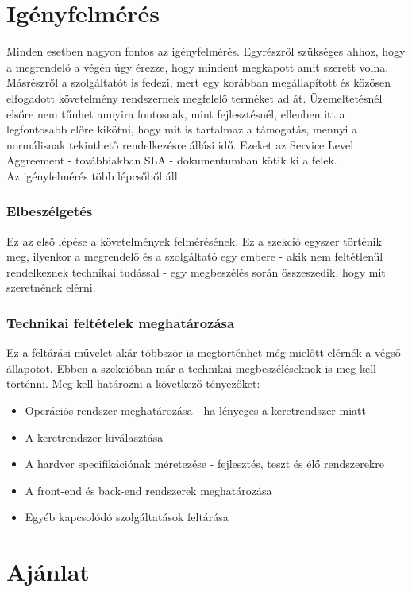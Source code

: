 \documentclass[12pt,oneside,justify,table]{book}
\begin{document}
\section{Igényfelmérés}
Minden esetben nagyon fontos az igényfelmérés. Egyrészről szükséges ahhoz, hogy a megrendelő a végén úgy érezze, hogy mindent megkapott amit szerett volna. Másrészről a szolgáltatót is fedezi, mert egy korábban megállapított és közösen elfogadott követelmény rendszernek megfelelő terméket ad át. Üzemeltetésnél elsőre nem tűnhet annyira fontosnak, mint fejlesztésnél, ellenben itt a legfontosabb előre kikötni, hogy mit is tartalmaz a támogatás, mennyi a normálisnak tekinthető rendelkezésre állási idő. Ezeket az Service Level Aggreement - továbbiakban SLA - dokumentumban kötik ki a felek. \\
Az igényfelmérés több lépcsőből áll. 
\subsubsection{Elbeszélgetés}
Ez az első lépése a követelmények felmérésének. Ez a szekció egyszer történik meg, ilyenkor a megrendelő és a szolgáltató egy embere - akik nem feltétlenül rendelkeznek technikai tudással - egy megbeszélés során összeszedik, hogy mit szeretnének elérni. 

\subsubsection{Technikai feltételek meghatározása}
Ez a feltárási művelet akár többször is megtörténhet még mielőtt elérnék a végső állapotot. Ebben a szekcióban már a technikai megbeszéléseknek is meg kell történni. 
Meg kell határozni a következő tényezőket:
\begin{itemize}
	\item Operációs rendszer meghatározása - ha lényeges a keretrendszer miatt
	\item A keretrendszer kiválasztása
	\item A hardver specifikációnak méretezése - fejlesztés, teszt és élő rendszerekre
	\item A front-end és back-end rendszerek meghatározása
	\item Egyéb kapcsolódó szolgáltatások feltárása 
\end{itemize}


\section{Ajánlat}
\end{document}
